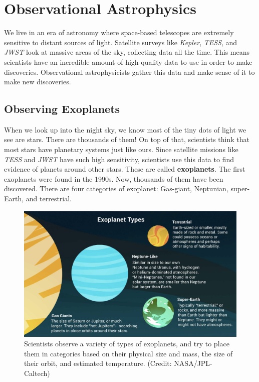 \documentclass[14pt]{article}
\newcommand\kw[1]{{\color{teal}#1}}
\begin{document}
\newpage

\section{Observational Astrophysics}


We live in an era of astronomy where space-based telescopes are extremely sensitive to distant sources of light. Satellite surveys like \textit{Kepler}, \textit{TESS}, and \textit{JWST} look at massive areas of the sky, collecting data all the time. This means scientists have an incredible amount of high quality data to use in order to make discoveries. Observational astrophysicists gather this data and make sense of it to make new discoveries.

\subsection{Observing Exoplanets}
When we look up into the night sky, we know most of the tiny dots of light we see are stars. There are thousands of them! On top of that, scientists think that most stars have planetary systems just like ours. Since satellite missions like \textit{TESS} and \textit{JWST} have such high sensitivity, scientists use this data to find evidence of planets around other stars. These are called \textbf{exoplanets}. The first exoplanets were found in the 1990s. Now, thousands of them have been discovered. There are four categories of exoplanet: Gas-giant, Neptunian, super-Earth, and terrestrial.

\begin{figure}[ht]
    \centering
    \includegraphics[width=\textwidth]{exo_types.png}
    \caption{Scientists observe a variety of types of exoplanets, and try to place them in categories based on their physical size and mass, the size of their orbit, and estimated temperature. (Credit: NASA/JPL-Caltech)}
    \label{fig:exo_types}
\end{figure}
\end{document}
